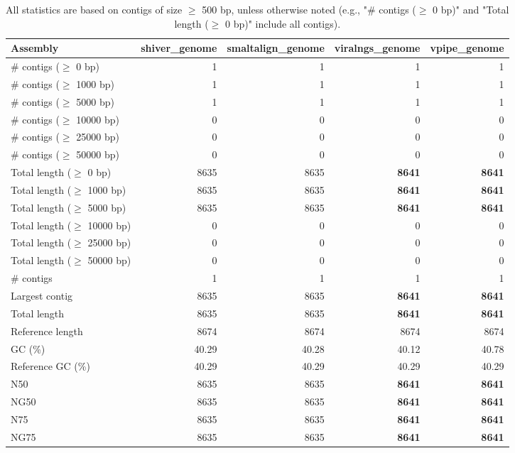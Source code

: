 \documentclass[12pt,a4paper]{article}
\begin{document}
\begin{table}[ht]
\begin{center}
\caption{All statistics are based on contigs of size $\geq$ 500 bp, unless otherwise noted (e.g., "\# contigs ($\geq$ 0 bp)" and "Total length ($\geq$ 0 bp)" include all contigs).}
\begin{tabular}{|l*{4}{|r}|}
\hline
Assembly & shiver\_genome & smaltalign\_genome & viralngs\_genome & vpipe\_genome \\ \hline
\# contigs ($\geq$ 0 bp) & 1 & 1 & 1 & 1 \\ \hline
\# contigs ($\geq$ 1000 bp) & 1 & 1 & 1 & 1 \\ \hline
\# contigs ($\geq$ 5000 bp) & 1 & 1 & 1 & 1 \\ \hline
\# contigs ($\geq$ 10000 bp) & 0 & 0 & 0 & 0 \\ \hline
\# contigs ($\geq$ 25000 bp) & 0 & 0 & 0 & 0 \\ \hline
\# contigs ($\geq$ 50000 bp) & 0 & 0 & 0 & 0 \\ \hline
Total length ($\geq$ 0 bp) & 8635 & 8635 & {\bf 8641} & {\bf 8641} \\ \hline
Total length ($\geq$ 1000 bp) & 8635 & 8635 & {\bf 8641} & {\bf 8641} \\ \hline
Total length ($\geq$ 5000 bp) & 8635 & 8635 & {\bf 8641} & {\bf 8641} \\ \hline
Total length ($\geq$ 10000 bp) & 0 & 0 & 0 & 0 \\ \hline
Total length ($\geq$ 25000 bp) & 0 & 0 & 0 & 0 \\ \hline
Total length ($\geq$ 50000 bp) & 0 & 0 & 0 & 0 \\ \hline
\# contigs & 1 & 1 & 1 & 1 \\ \hline
Largest contig & 8635 & 8635 & {\bf 8641} & {\bf 8641} \\ \hline
Total length & 8635 & 8635 & {\bf 8641} & {\bf 8641} \\ \hline
Reference length & 8674 & 8674 & 8674 & 8674 \\ \hline
GC (\%) & 40.29 & 40.28 & 40.12 & 40.78 \\ \hline
Reference GC (\%) & 40.29 & 40.29 & 40.29 & 40.29 \\ \hline
N50 & 8635 & 8635 & {\bf 8641} & {\bf 8641} \\ \hline
NG50 & 8635 & 8635 & {\bf 8641} & {\bf 8641} \\ \hline
N75 & 8635 & 8635 & {\bf 8641} & {\bf 8641} \\ \hline
NG75 & 8635 & 8635 & {\bf 8641} & {\bf 8641} \\ \hline

\end{tabular}
\end{center}
\end{table}
\end{document}
